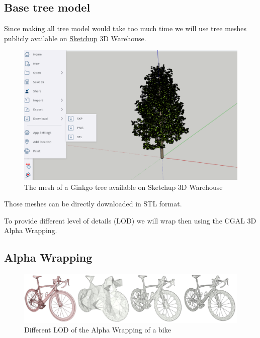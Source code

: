 \documentclass[12pt]{article}
\begin{document}
\subsection{Base tree model}
Since making all tree model would take too much time we will use tree meshes
publicly available on \href{https://app.sketchup.com/app}{Sketchup} 3D Warehouse.

\begin{figure}[H]
    \centering
        \centering
        \includegraphics[width=\textwidth]{images/ginkgo_sketchup.png}
        \caption{The mesh of a Ginkgo tree available on Sketchup 3D Warehouse}
\end{figure}

Those meshes can be directly downloaded in STL format.  

To provide different level of details (LOD) we will wrap then using the
CGAL 3D Alpha Wrapping\cite{cgal_alpha_wrapper}.

\subsection{Alpha Wrapping}
\begin{figure}[H]
    \centering
        \centering
        \includegraphics[width=\textwidth]{images/aw3_bike_lod.jpg}
        \caption{Different LOD of the Alpha Wrapping of a bike}
\end{figure}
\end{document}
